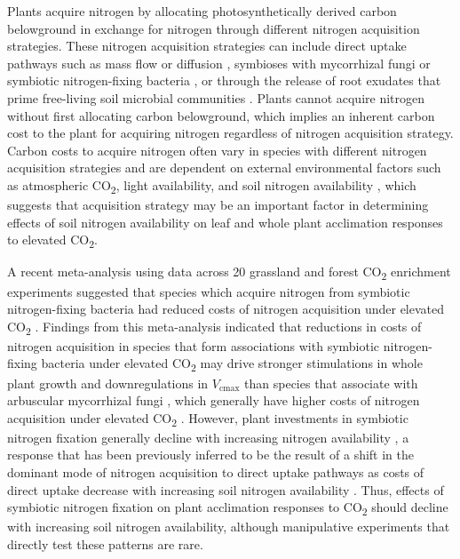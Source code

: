     Plants acquire nitrogen by allocating photosynthetically derived carbon belowground in exchange for nitrogen through different nitrogen acquisition strategies. These nitrogen acquisition strategies can include direct uptake pathways such as mass flow or diffusion , symbioses with mycorrhizal fungi or symbiotic nitrogen-fixing bacteria , or through the release of root exudates that prime free-living soil microbial communities . Plants cannot acquire nitrogen without first allocating carbon belowground, which implies an inherent carbon cost to the plant for acquiring nitrogen regardless of nitrogen acquisition strategy. Carbon costs to acquire nitrogen often vary in species with different nitrogen acquisition strategies and are dependent on external environmental factors such as atmospheric CO\textsubscript{2}, light availability, and soil nitrogen availability , which suggests that acquisition strategy may be an important factor in determining effects of soil nitrogen availability on leaf and whole plant acclimation responses to elevated CO\textsubscript{2}.

    A recent meta-analysis using data across 20 grassland and forest CO\textsubscript{2} enrichment experiments suggested that species which acquire nitrogen from symbiotic nitrogen-fixing bacteria had reduced costs of nitrogen acquisition under elevated CO\textsubscript{2} . Findings from this meta-analysis indicated that reductions in costs of nitrogen acquisition in species that form associations with symbiotic nitrogen-fixing bacteria under elevated CO\textsubscript{2} may drive stronger stimulations in whole plant growth and downregulations in $V_\mathrm{cmax}$ than species that associate with arbuscular mycorrhizal fungi , which generally have higher costs of nitrogen acquisition under elevated CO\textsubscript{2} . However, plant investments in symbiotic nitrogen fixation generally decline with increasing nitrogen availability , a response that has been previously inferred to be the result of a shift in the dominant mode of nitrogen acquisition to direct uptake pathways as costs of direct uptake decrease with increasing soil nitrogen availability . Thus, effects of symbiotic nitrogen fixation on plant acclimation responses to CO\textsubscript{2} should decline with increasing soil nitrogen availability, although manipulative experiments that directly test these patterns are rare.

